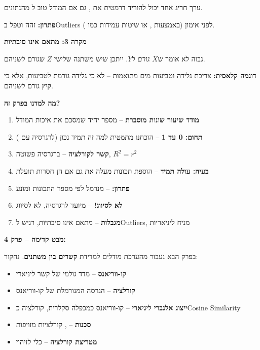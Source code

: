 ערך חריג אחד יכול להוריד דרמטית את \Rsquared{}, גם אם המודל טוב ל\en{-} מהנתונים.

\textbf{פתרון:} זהה וטפל ב\en{-}Outliers לפני אימון (באמצעות , או שיטות עמידות כמו ).

\textbf{מקרה \num{3}: מתאם אינו סיבתיות}

\Rsquared{} גבוה לא אומר ש\en{-}$X$ \textit{גורם} ל\en{-}$Y$. ייתכן שיש משתנה שלישי $Z$ שגורם לשניהם.

\textbf{דוגמה קלאסית:} צריכת גלידה וטביעות מים מתואמות – לא כי גלידה גורמת לטביעות, אלא כי \textbf{קיץ} גורם לשניהם.


\textbf{מה למדנו בפרק זה?}

\begin{enumerate}
\item \textbf{\Rsquared{} מודד שיעור שונות מוסברת} – מספר יחיד שמסכם את איכות המודל
\item \textbf{תחום: \num{0} עד \num{1}} – הוכחנו מתמטית למה זה תמיד נכון (לרגרסיה עם )
\item \textbf{קשר לקורלציה} – ברגרסיה פשוטה, $R^2 = r^2$
\item \textbf{בעיה: עולה תמיד} – הוספת תכונות מעלה את \Rsquared{} גם אם הן חסרות תועלת
\item \textbf{פתרון: } – מנרמל לפי מספר התכונות ומונע 
\item \textbf{לא לסיווג!} – \Rsquared{} מיועד לרגרסיה, לא לסיווג
\item \textbf{מגבלות} – מתאם אינו סיבתיות, רגיש ל\en{-}Outliers, מניח ליניאריות
\end{enumerate}

\textbf{מבט קדימה – פרק \num{4}:}

בפרק הבא נעבור מהערכת מודלים למדידת \textbf{קשרים בין משתנים}. נחקור:

\begin{itemize}
\item \textbf{קו-ווריאנס}  – מדד גולמי של קשר ליניארי
\item \textbf{קורלציה}  – הגרסה המנורמלת של קו-ווריאנס
\item \textbf{ייצוג אלגברי ליניארי} – קו-ווריאנס כמכפלה סקלרית, קורלציה כ\en{-}Cosine Similarity
\item \textbf{סכנות} – , קורלציות מזויפות
\item \textbf{מטריצת קורלציה} – כלי לזיהוי 
\end{itemize}

